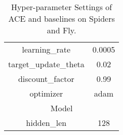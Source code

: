 \documentclass[letterpaper]{article} \usepackage{aaai23}  \usepackage{times}  \usepackage{helvet}  \usepackage{courier}  \usepackage[hyphens]{url}  \usepackage{graphicx} \urlstyle{rm} \def\UrlFont{\rm}  \usepackage{natbib}  \usepackage{caption} \frenchspacing  \setlength{\pdfpagewidth}{8.5in} \setlength{\pdfpageheight}{11in} \usepackage{algorithm}
\begin{document}
\begin{table}[h]
{\begin{tabular}{cc}
\multicolumn{1}{c|}{learning\_rate}        & 0.0005
\\
\multicolumn{1}{c|}{target\_update\_theta} & 0.02                            \\
\multicolumn{1}{c|}{discount\_factor}      & 0.99                             \\
\multicolumn{1}{c|}{optimizer}             & adam                          \\ \midrule
\multicolumn{2}{c}{Model}                                             \\ \midrule
\multicolumn{1}{c|}{hidden\_len}           & 128                              \\
\bottomrule
\end{tabular}
}
\vspace{-0.2cm}
\caption{Hyper-parameter Settings of ACE and baselines on Spiders and Fly.}
\vspace{-3ex}
\label{appendix:spider_hyperparameter}
\end{table}

\begin{table}[h]
\centering
{}
\vspace{-0.2cm}
\caption{Input Feature on Spiders and Fly.}
\vspace{-3ex}
\label{appendix:spider_feature}
\end{table}
\end{document}
